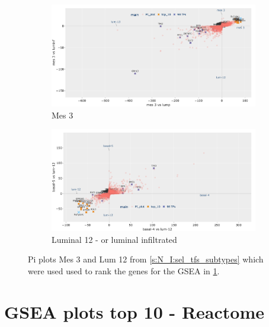 \begin{figure}[!h]
    \centering
    \begin{subfigure}[!t]{1.0\textwidth}
        \includegraphics[width=\textwidth,keepaspectratio]{Sections/Network_I/Resources/selective_pruning/pi_gsea/pi_mesLike.png}
        \caption{Mes 3}
        \label{fig:ap:mes_like}
    \end{subfigure}
    \begin{subfigure}[!t]{1.0\textwidth}
        \includegraphics[width=\textwidth,keepaspectratio]{Sections/Network_I/Resources/selective_pruning/pi_gsea/pi_lumInf.png}
        \caption{Luminal 12 - or luminal infiltrated}
        \label{fig:ap:lumInf}
    \end{subfigure} 
    \caption[Mes-3 and Lum 12 pi plots]{Pi plots Mes 3 and Lum 12 from \cref{s:N_I:sel_tfs_subtypes} which were used used to rank the genes for the GSEA in \cref{s:ap:sel_tfs_gsea_reactome}.}
    \label{fig:ap:pi_other_values_II}
\end{figure}

\newpage


\section{GSEA plots top 10 - Reactome} \label{s:ap:sel_tfs_gsea_reactome}

